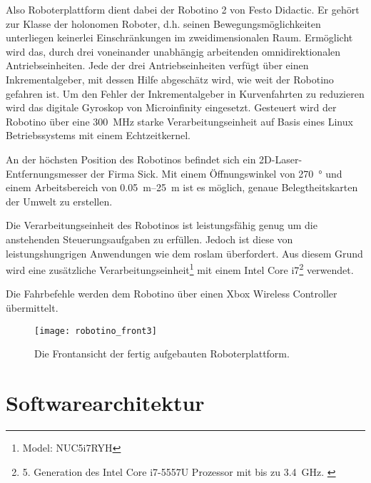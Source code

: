 Also Roboterplattform dient dabei der Robotino 2 von Festo Didactic. Er gehört zur Klasse der holonomen Roboter, d.h. seinen Bewegungsmöglichkeiten unterliegen keinerlei Einschränkungen im zweidimensionalen Raum. Ermöglicht wird das, durch drei voneinander unabhängig arbeitenden omnidirektionalen Antriebseinheiten. Jede der drei Antriebseinheiten verfügt über einen Inkrementalgeber, mit dessen Hilfe abgeschätz wird, wie weit der Robotino gefahren ist. Um den Fehler der Inkrementalgeber in Kurvenfahrten zu reduzieren wird das digitale Gyroskop\footnotemark{} von Microinfinity eingesetzt. Gesteuert wird der Robotino über eine \SI{300}{\MHz} starke Verarbeitungseinheit auf Basis eines Linux Betriebssystems mit einem Echtzeitkernel. \cite{festo2007robotinomanual} 

An der höchsten Position des Robotinos befindet sich ein 2D-Laser-Entfernungsmesser\footnotemark{} der Firma Sick. Mit einem Öffnungswinkel von \SI{270}{\degree} und einem Arbeitsbereich von \SIrange{0.05}{25}{\meter} ist es möglich, genaue Belegtheitskarten der Umwelt zu erstellen. \cite{sick2016operatingmanual} 

Die Verarbeitungseinheit des Robotinos ist leistungsfähig genug um die anstehenden Steuerungsaufgaben zu erfüllen. Jedoch ist diese von leistungshungrigen Anwendungen wie dem \Gls{roslam} überfordert. Aus diesem Grund wird eine zusätzliche Verarbeitungseinheit\footnote{Model: NUC5i7RYH} mit einem Intel Core i7\footnote{5. Generation des Intel Core i7-5557U Prozessor mit bis zu \SI{3.4}{\GHz}. \cite{intel2015nucproductbrief}} verwendet.

Die Fahrbefehle werden dem Robotino über einen Xbox Wireless Controller übermittelt.

\begin{figure}
	\centering
	\texttt{[image: robotino\_front3]}
	\caption{Die Frontansicht der fertig aufgebauten Roboterplattform.}
	\label{fig:robotino_front}
\end{figure}


%
%
\section{Softwarearchitektur}

